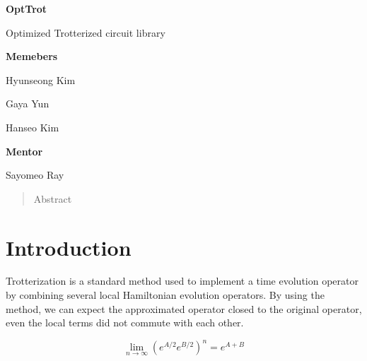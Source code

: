 \documentclass[a4paper,12pt]{article}
\newcommand{\courseName}{2024 IonQ summer Mentoring}
\newcommand{\assignmentTitle}{OptTrot}
\begin{document}
\begin{center}

    \vspace{0.5cm}
    {\Large\bfseries \assignmentTitle \par}
    {\large Optimized Trotterized circuit library \par}
    \vspace{1cm}
    {
    \noindent
    \begin{minipage}{0.45\textwidth}
        \centering
        \textbf{Memebers}

        Hyunseong Kim

        Gaya Yun

        Hanseo Kim
    \end{minipage}
    \begin{minipage}{0.45\textwidth}
        \centering
        \textbf{Mentor}

        Sayomeo Ray
    \end{minipage}
    }
    \begin{abstract}
    Abstract
    \end{abstract}
\end{center}



\section{Introduction}

Trotterization is a standard method used to implement a time evolution operator 
by combining several local Hamiltonian evolution operators.
By using the method, we can expect the approximated operator closed to the original
operator, even the local terms did not commute with each other.

\begin{equation}
    \lim_{n \rightarrow \infty} (e^{A/2} e^{B/2})^n = e^{A+B}
\end{equation}
\end{document}
